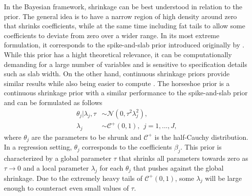 In the Bayesian framework, shrinkage can be best understood in relation to the prior.
The general idea is to have a narrow region of high density around zero that shrinks coefficients,
while at the same time including fat tails to allow some coefficients to deviate from zero over a wider range.
In its most extreme formulation, it corresponds to the spike-and-slab prior introduced originally by \cite{mitchell_bayesian_1988}.
While this prior has a hight theoretical relevance, it can be computationally demanding for a large number of variables and is sensitive to specification details such as slab width.
On the other hand, continuous shrinkage priors provide similar results while also being easier to compute \citep{piironen_sparsity_2017}.
The horseshoe prior \citep{carvalho_horseshoe_2010} is a continuous shrinkage prior with a similar performance to the spike-and-slab prior and can be formulated as follows
\begin{equation}
    \begin{split}
        \theta_j | \lambda_j, \tau & \sim \mathcal N (0, \tau^2\lambda^2_j), \\
        \lambda_j & \sim \mathcal C^+ (0, 1), ~~ j = 1,..., J,
    \end{split}
    \label{eq_hs}
\end{equation}
where $\theta_j$ are the parameters to be shrunk and $\mathcal C^+$ is the half-Cauchy distribution. In a regression setting, $\theta_j$ corresponds to the coefficients $\beta_j$.
This prior is characterized by a global parameter $\tau$ that shrinks all parameters towards zero as $\tau \rightarrow 0$ and a local parameter $\lambda_j$ for each $\theta_j$ that pushes against the global shrinkage.
Due to the extremely heavy tails of $\mathcal C^+(0, 1)$, some $\lambda_j$ will be large enough to counteract even small values of $\tau$.

